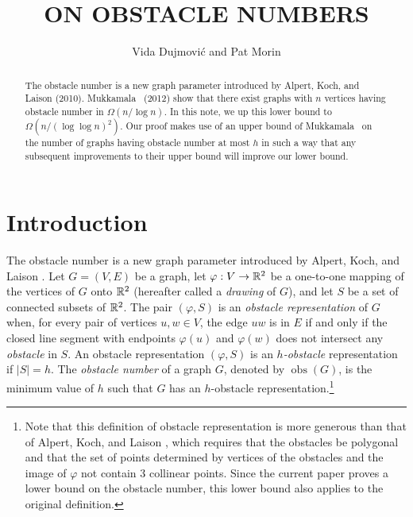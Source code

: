 \documentclass{patmorin}
\title{\MakeUppercase{On Obstacle Numbers}}
\author{Vida Dujmovi\'c and Pat Morin}
\DeclareMathOperator{\obs}{obs}
\renewcommand{\note}[1]{}
\begin{document}
\begin{titlepage}
\maketitle

\begin{abstract}
\setlength{\baselineskip}{16.8pt}
The obstacle number is a new graph parameter introduced by Alpert, Koch,
and Laison (2010).  Mukkamala \etal\ (2012) show that there exist graphs
with $n$ vertices having obstacle number in $\Omega(n/\log n)$. In this
note, we up this lower bound to $\Omega(n/(\log\log n)^2)$.  Our proof
makes use of an upper bound of Mukkamala \etal\ on the number of graphs
having obstacle number at most $h$ in such a way that any subsequent
improvements to their upper bound will improve our lower bound.
\end{abstract}
\end{titlepage}


\section{Introduction}

\setlength{\baselineskip}{16.8pt}
The obstacle number is a new graph parameter introduced by Alpert, Koch,
and Laison \cite{alpert.koch.ea:obstacle}.  Let $G=(V,E)$ be a graph,
let $\varphi:V\to \mathbb{R}^2$ be a one-to-one mapping of the vertices of
$G$ onto $\mathbb{R}^2$ (hereafter called a \emph{drawing} of $G$), and let $S$
be a set of connected subsets of $\mathbb{R}^2$.  The pair $(\varphi,S)$ is an
\emph{obstacle representation} of $G$ when, for every pair of vertices
$u,w\in V$, the edge $uw$ is in $E$ if and only if the closed line
segment with endpoints $\varphi(u)$ and $\varphi(w)$ does not intersect
any \emph{obstacle} in $S$.\note{Changing open to closed handles obstacles
that sneak through vertices.}  An obstacle representation $(\varphi,S)$
is an \emph{$h$-obstacle} representation if $|S|=h$.  The \emph{obstacle
number} of a graph $G$, denoted by $\obs(G)$, is the minimum value of $h$
such that $G$ has an $h$-obstacle representation.\footnote{Note that
this definition of obstacle representation is more generous than that of Alpert, Koch, and Laison \cite{alpert.koch.ea:obstacle}, which requires that the obstacles be polygonal and that the
set of points determined by vertices of the obstacles and the image of $\varphi$ not contain 3 collinear points. Since the current
paper proves a lower bound on the obstacle number, this lower bound
also applies to the original definition.}
\note{Obstacles that intersect each other is fine.}
\note{Changed $w(n)$ to $\obs(n)$}
\end{document}
